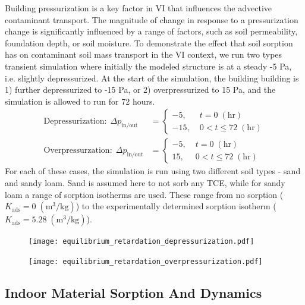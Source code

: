 Building pressurization is a key factor in VI that influences the advective contaminant transport.
The magnitude of change in response to a pressurization change is significantly influenced by a range of factors, such as soil permeability, foundation depth, or soil moisture.
To demonstrate the effect that soil sorption has on contaminant soil mass transport in the VI context, we run two types transient simulation where initially the modeled structure is at a steady -5 Pa, i.e. slightly depressurized.
At the start of the simulation, the building building is 1) further depressurized to -15 Pa, or 2) overpressurized to 15 Pa, and the simulation is allowed to run for 72 hours.
\begin{align}
  \text{Depressurization}: \; \Delta p_\mathrm{in/out} &= \begin{cases}
    -5, \; &t = 0 \; \mathrm{(hr)} \\
    -15, \; &0 < t \leq 72 \; \mathrm{(hr)}
\end{cases}\\
\text{Overpressurzation}: \; \Delta p_\mathrm{in/out} &= \begin{cases}
  -5, \; &t = 0 \; \mathrm{(hr)} \\
  15, \; &0 < t \leq 72 \; \mathrm{(hr)}
\end{cases}
\end{align}
For each of these cases, the simulation is run using two different soil types - sand and sandy loam.
Sand is assumed here to not sorb any TCE, while for sandy loam a range of sorption isotherms are used.
These range from no sorption ($K_\mathrm{ads} = 0 \; \mathrm{(m^3/kg)}$) to the experimentally determined sorption isotherm ($K_\mathrm{ads} = 5.28 \; \mathrm{(m^3/kg)}$).\par

\begin{figure}[!htb]
  \texttt{[image: equilibrium\_retardation\_depressurization.pdf]}
  \caption{}
  \label{fig:equilibrium_depressurization}
\end{figure}


\begin{figure}[!htb]
  \texttt{[image: equilibrium\_retardation\_overpressurization.pdf]}
  \caption{}
  \label{fig:equilibrium_overpressurization}
\end{figure}


\subsection{Indoor Material Sorption And Dynamics}


